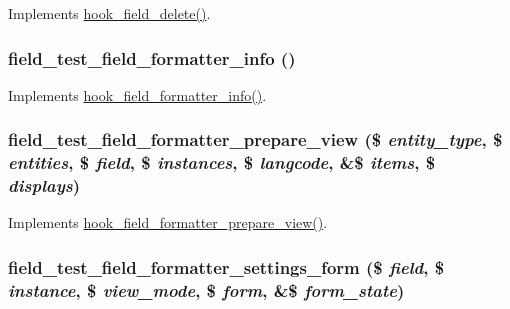 \label{field__test_8field_8inc_a464cdbf377c9cb309ce5c1257be479a3}
Implements \hyperlink{group__field__types_gaf1e5787044b83d34cf7daed3d5297336}{hook\_\-field\_\-delete()}. \hypertarget{field__test_8field_8inc_a538bb04b725628518604eece404ab6dc}{
\subsubsection[{field\_\-test\_\-field\_\-formatter\_\-info}]{\setlength{\rightskip}{0pt plus 5cm}field\_\-test\_\-field\_\-formatter\_\-info ()}}
\label{field__test_8field_8inc_a538bb04b725628518604eece404ab6dc}
Implements \hyperlink{group__field__formatter_ga2f5aa1c7455f55dffd84a48efa57f987}{hook\_\-field\_\-formatter\_\-info()}. \hypertarget{field__test_8field_8inc_aaf187b49a05422065c4df4e596d4b8a4}{
\subsubsection[{field\_\-test\_\-field\_\-formatter\_\-prepare\_\-view}]{\setlength{\rightskip}{0pt plus 5cm}field\_\-test\_\-field\_\-formatter\_\-prepare\_\-view (\$ {\em entity\_\-type}, \/  \$ {\em entities}, \/  \$ {\em field}, \/  \$ {\em instances}, \/  \$ {\em langcode}, \/  \&\$ {\em items}, \/  \$ {\em displays})}}
\label{field__test_8field_8inc_aaf187b49a05422065c4df4e596d4b8a4}
Implements \hyperlink{group__field__formatter_ga2c1856869caa776fd9e5db4af4e0b57b}{hook\_\-field\_\-formatter\_\-prepare\_\-view()}. \hypertarget{field__test_8field_8inc_aae6632286258431d3932e251212026d3}{
\subsubsection[{field\_\-test\_\-field\_\-formatter\_\-settings\_\-form}]{\setlength{\rightskip}{0pt plus 5cm}field\_\-test\_\-field\_\-formatter\_\-settings\_\-form (\$ {\em field}, \/  \$ {\em instance}, \/  \$ {\em view\_\-mode}, \/  \$ {\em form}, \/  \&\$ {\em form\_\-state})}}

